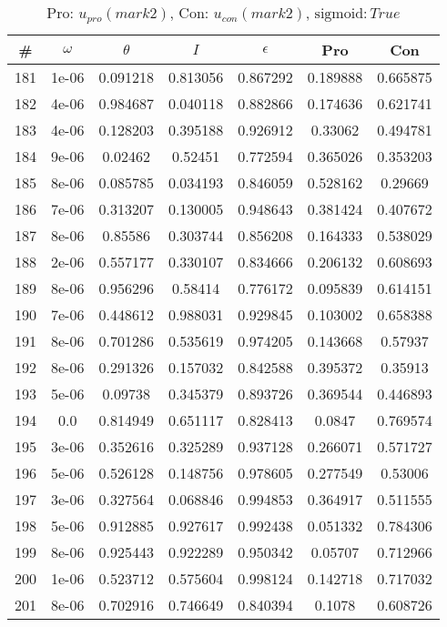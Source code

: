 \newpage
\begin{table}
\caption{Pro: $u_{pro} (mark 2)$, Con: $u_{con} (mark 2)$, $\mathrm{sigmoid}: True$}
\begin{tabular*}{\linewidth}{c|c|c|c|c|c|c}
\# & $\omega$ & $\theta$ & $I$ & $\epsilon$ & Pro & Con \\
\hline
181 & 1e-06 & 0.091218 & 0.813056 & 0.867292 & 0.189888 & 0.665875\\
182 & 4e-06 & 0.984687 & 0.040118 & 0.882866 & 0.174636 & 0.621741\\
183 & 4e-06 & 0.128203 & 0.395188 & 0.926912 & 0.33062 & 0.494781\\
184 & 9e-06 & 0.02462 & 0.52451 & 0.772594 & 0.365026 & 0.353203\\
185 & 8e-06 & 0.085785 & 0.034193 & 0.846059 & 0.528162 & 0.29669\\
186 & 7e-06 & 0.313207 & 0.130005 & 0.948643 & 0.381424 & 0.407672\\
187 & 8e-06 & 0.85586 & 0.303744 & 0.856208 & 0.164333 & 0.538029\\
188 & 2e-06 & 0.557177 & 0.330107 & 0.834666 & 0.206132 & 0.608693\\
189 & 8e-06 & 0.956296 & 0.58414 & 0.776172 & 0.095839 & 0.614151\\
190 & 7e-06 & 0.448612 & 0.988031 & 0.929845 & 0.103002 & 0.658388\\
191 & 8e-06 & 0.701286 & 0.535619 & 0.974205 & 0.143668 & 0.57937\\
192 & 8e-06 & 0.291326 & 0.157032 & 0.842588 & 0.395372 & 0.35913\\
193 & 5e-06 & 0.09738 & 0.345379 & 0.893726 & 0.369544 & 0.446893\\
194 & 0.0 & 0.814949 & 0.651117 & 0.828413 & 0.0847 & 0.769574\\
195 & 3e-06 & 0.352616 & 0.325289 & 0.937128 & 0.266071 & 0.571727\\
196 & 5e-06 & 0.526128 & 0.148756 & 0.978605 & 0.277549 & 0.53006\\
197 & 3e-06 & 0.327564 & 0.068846 & 0.994853 & 0.364917 & 0.511555\\
198 & 5e-06 & 0.912885 & 0.927617 & 0.992438 & 0.051332 & 0.784306\\
199 & 8e-06 & 0.925443 & 0.922289 & 0.950342 & 0.05707 & 0.712966\\
200 & 1e-06 & 0.523712 & 0.575604 & 0.998124 & 0.142718 & 0.717032\\
201 & 8e-06 & 0.702916 & 0.746649 & 0.840394 & 0.1078 & 0.608726\\

\end{tabular*}
\end{table}
